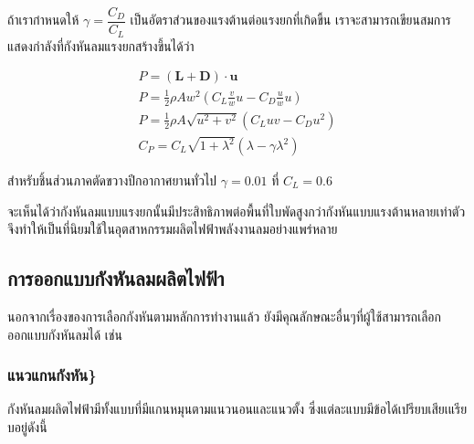 \documentclass[11pt]{article}
\begin{document}
ถ้าเรากำหนดให้ \(\gamma = \dfrac{C_D}{C_L}\) เป็นอัตราส่วนของแรงต้านต่อแรงยกที่เกิดขึ้น เราจะสามารถเขียนสมการแสดงกำลังที่กังหันลมแรงยกสร้างขึ้นได้ว่า

\begin{gather}
  P = (\mathbf{L} + \mathbf{D}) \cdot \mathbf{u} \nonumber \\
  P = \frac{1}{2}\rho A w^2 (C_L \frac{v}{w} u - C_D \frac{u}{w}u) \nonumber \\
  P = \frac{1}{2}\rho A \sqrt{u^2 + v^2} \left( C_L u v - C_D u^2 \right) \nonumber \\
   C_P = C_L \sqrt{1+\lambda^2} \left( \lambda - \gamma \lambda^2 \right) 
\end{gather}

สำหรับชิ้นส่วนภาคตัดขวางปีกอากาศยานทั่วไป \(\gamma =  0.01\) ที่ \(C_L = 0.6\)

\begin{figure}[h]
\end{figure}

จะเห็นได้ว่ากังหันลมแบบแรงยกนั้นมีประสิทธิภาพต่อพื้นที่ใบพัดสูงกว่ากังหันแบบแรงต้านหลายเท่าตัว จึงทำให้เป็นที่นิยมใช้ในอุตสาหกรรมผลิตไฟฟ้าพลังงานลมอย่างแพร่หลาย

\subsection{การออกแบบกังหันลมผลิตไฟฟ้า}
\label{sec:orga979388}

นอกจากเรื่องของการเลือกกังหันตามหลักการทำงานแล้ว ยังมีคุณลักษณะอื่นๆที่ผู้ใช้สามารถเลือกออกแบบกังหันลมได้ เช่น

\subsubsection{แนวแกนกังหัน\}}
\label{sec:org7efd506}

กังหันลมผลิตไฟฟ้ามีทั้งแบบที่มีแกนหมุนตามแนวนอนและแนวตั้ง ซึ่งแต่ละแบบมีข้อได้เปรียบเสียเแรียบอยู่ดังนี้
\end{document}
